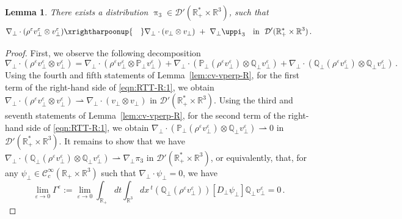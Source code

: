 \documentclass[11pt,reqno]{amsart}
\newtheorem{lemma}{Lemma}
\def \R{{\mathbb{R}}}
\def \Q{{\mathbb{Q}}}
\def \P{{\mathbb{P}}}
\begin{document}
\begin{lemma}
\label{lem:cv-rvpvp-R} There exists a distribution $\uppi_3 \in \mathcal D'(\R_+^* \times \R^3)$, such that
  \begin{equation*}
    \nabla_\perp \cdot (\rho^\varepsilon v_\perp^\varepsilon \otimes v_\perp^\varepsilon) \xrightharpoonup{\quad}
    \nabla_\perp \cdot ( v_\perp \otimes v_\perp)  \ + \ \nabla_\perp \uppi_3 \ \ \mbox{ in } \
    \mathcal{D}'(\R_+^*\times \R^3)\,.
   \end{equation*}
\end{lemma}

\begin{proof}
  First, we observe the following decomposition
  \begin{equation}
    \label{eqn:RTT-R:1}
    \nabla_\perp \cdot (\rho^\varepsilon v_\perp^\varepsilon \otimes v_\perp^\varepsilon)
    = \nabla_\perp \cdot (\rho^\varepsilon v_\perp^\varepsilon \otimes \P_\perp v_\perp^\varepsilon)
    +  \nabla_\perp \cdot (\P_\perp(\rho^\varepsilon v_\perp^\varepsilon) \otimes \Q_\perp v_\perp^\varepsilon)
    + \nabla_\perp \cdot (\Q_\perp(\rho^\varepsilon v_\perp^\varepsilon) \otimes \Q_\perp v_\perp^\varepsilon)\,.
  \end{equation}
  Using the fourth and fifth statements of  Lemma~\ref{lem:cv-vperp-R},  for the first term of the right-hand side of \eqref{eqn:RTT-R:1}, we obtain $\nabla_\perp \cdot (\rho^\varepsilon v_\perp^\varepsilon \otimes v_\perp^\varepsilon) \rightharpoonup \nabla_\perp \cdot ( v_\perp \otimes v_\perp)$ in $\mathcal D'(\R_+^* \times \R^3)$. Using the third and seventh statements of  Lemma~\ref{lem:cv-vperp-R}, for the second term of the right-hand side of \eqref{eqn:RTT-R:1}, we obtain $\nabla_\perp \cdot (\P_\perp(\rho^\varepsilon v_\perp^\varepsilon) \otimes \Q_\perp v_\perp^\varepsilon) \rightharpoonup 0 $ in $\mathcal D'(\R_+^* \times \R^3)$. It remains to show that we have $\nabla_\perp \cdot (\Q_\perp(\rho^\varepsilon v_\perp^\varepsilon) \otimes \Q_\perp v_\perp^\varepsilon) \rightharpoonup \nabla_\perp \pi_3 $ in  $\mathcal D'(\R_+^* \times \R^3)$, or equivalently, that, for any $\psi_\perp \in \mathscr{C}_c^\infty(\R_+\times \R^3)$ such that $\nabla_\perp\cdot  \psi_\perp =0$, we have
  \begin{equation}
    \label{eqn:RTT-R:2}
    \lim_{\varepsilon \rightarrow 0} \Gamma^\varepsilon := \lim_{\varepsilon \rightarrow 0}  \int_{\R_+} dt \int_{\R^3}dx\, {}^t(\Q_\perp(\rho^\varepsilon v_\perp^\varepsilon))
        [D_\perp \psi_\perp] \Q_\perp v_\perp^\varepsilon =0\,.

\end{equation}
\end{proof}
\end{document}
